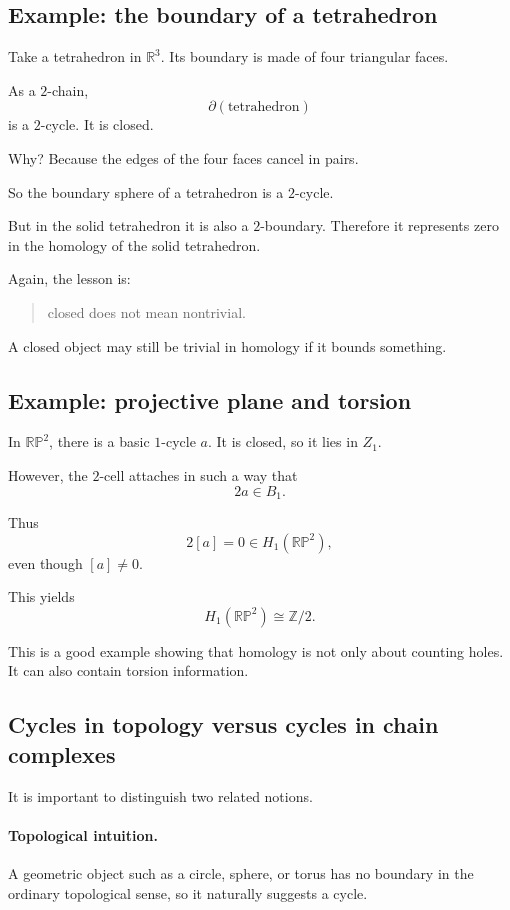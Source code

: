 \documentclass[12pt,a4paper]{article}
\theoremstyle{notespace}
\begin{document}
\subsection{ Example: the boundary of a tetrahedron}

Take a tetrahedron in \(\mathbb R^3\). Its boundary is made of four triangular faces.

As a \(2\)-chain,
\[
\partial(\text{tetrahedron})
\]
is a \(2\)-cycle. It is closed.

Why? Because the edges of the four faces cancel in pairs.

So the boundary sphere of a tetrahedron is a \(2\)-cycle.

But in the solid tetrahedron it is also a \(2\)-boundary. Therefore it represents zero in the homology of the solid tetrahedron.

Again, the lesson is:

\begin{quote}
	closed does not mean nontrivial.
\end{quote}

A closed object may still be trivial in homology if it bounds something.

\subsection{ Example: projective plane and torsion}

In \(\mathbb{RP}^2\), there is a basic \(1\)-cycle \(a\). It is closed, so it lies in \(Z_1\).

However, the \(2\)-cell attaches in such a way that
\[
2a \in B_1.
\]

Thus
\[
2[a]=0 \in H_1(\mathbb{RP}^2),
\]
even though \([a]\neq 0\).

This yields
\[
H_1(\mathbb{RP}^2)\cong \mathbb Z/2.
\]

This is a good example showing that homology is not only about counting holes. It can also contain torsion information.

\subsection{ Cycles in topology versus cycles in chain complexes}

It is important to distinguish two related notions.

\paragraph{Topological intuition.}
A geometric object such as a circle, sphere, or torus has no boundary in the ordinary topological sense, so it naturally suggests a cycle.
\end{document}
